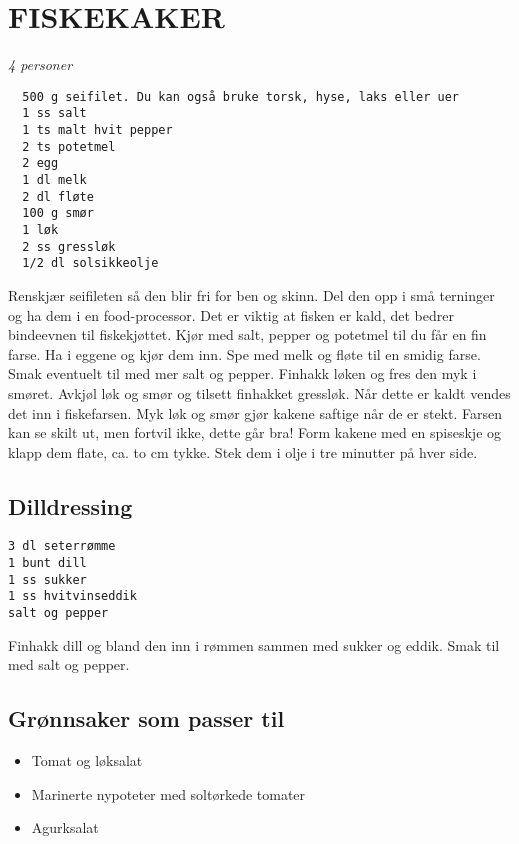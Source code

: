 \documentclass[11pt,]{article}
\date{}
\begin{document}
{
\hypersetup{linkcolor=black}
\setcounter{tocdepth}{3}
\tableofcontents
}
\clearpage

\section{FISKEKAKER}\label{fiskekaker}

\emph{4 personer}

\begin{verbatim}
  500 g seifilet. Du kan også bruke torsk, hyse, laks eller uer
  1 ss salt
  1 ts malt hvit pepper
  2 ts potetmel
  2 egg
  1 dl melk
  2 dl fløte
  100 g smør
  1 løk
  2 ss gressløk
  1/2 dl solsikkeolje
\end{verbatim}

Renskjær seifileten så den blir fri for ben og skinn. Del den opp i små
terninger og ha dem i en food-processor. Det er viktig at fisken er
kald, det bedrer bindeevnen til fiskekjøttet. Kjør med salt, pepper og
potetmel til du får en fin farse. Ha i eggene og kjør dem inn. Spe med
melk og fløte til en smidig farse. Smak eventuelt til med mer salt og
pepper. Finhakk løken og fres den myk i smøret. Avkjøl løk og smør og
tilsett finhakket gressløk. Når dette er kaldt vendes det inn i
fiskefarsen. Myk løk og smør gjør kakene saftige når de er stekt. Farsen
kan se skilt ut, men fortvil ikke, dette går bra! Form kakene med en
spiseskje og klapp dem ﬂate, ca. to cm tykke. Stek dem i olje i tre
minutter på hver side.

\subsection{Dilldressing}\label{dilldressing}

\begin{verbatim}
3 dl seterrømme
1 bunt dill
1 ss sukker
1 ss hvitvinseddik
salt og pepper
\end{verbatim}

Finhakk dill og bland den inn i rømmen sammen med sukker og eddik. Smak
til med salt og pepper.

\subsection{Grønnsaker som passer
til}\label{gruxf8nnsaker-som-passer-til}

\begin{itemize}
\itemsep1pt\parskip0pt
\item
  Tomat og løksalat
\item
  Marinerte nypoteter med soltørkede tomater
\item
  Agurksalat
\end{itemize}
\end{document}
